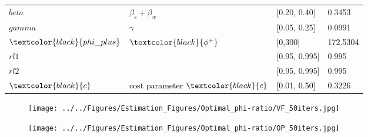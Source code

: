 \documentclass{../cls/NotesV2_Class}
\begin{document}
\begin{center}
\begin{tabular}[h]{ |p{3cm}||p{6cm}|p{2cm}|p{2cm}|  }
 $beta$ & $\beta_s+\beta_w $ & [0.20, 0.40] & 0.3453\\
 $gamma$ & $\gamma$ & [0.05, 0.25] & 0.0991 \\
 $\textcolor{black}{phi\_plus}$ & $\textcolor{black}{\phi^+}$ & \textcolor{black}{[0,300]} & \textcolor{black}{172.5304}\\
 $rl1$ & & [0.95, 0.995] & 0.995\\
 $rl2$ & & [0.95, 0.995] & 0.995\\
 $\textcolor{black}{c}$ & \textcolor{black}{cost parameter} $\textcolor{black}{c}$ & \textcolor{black}{[0.01, 0.50]} & \textcolor{black}{0.3226}\\
 \hline
\end{tabular}
\end{center}

\begin{figure}[htbp!]
\texttt{[image: ../../Figures/Estimation\_Figures/Optimal\_phi-ratio/VF\_50iters.jpg]}
\end{figure}

\begin{figure}[htbp!]
\texttt{[image: ../../Figures/Estimation\_Figures/Optimal\_phi-ratio/OP\_50iters.jpg]}
\end{figure}


\end{document}
